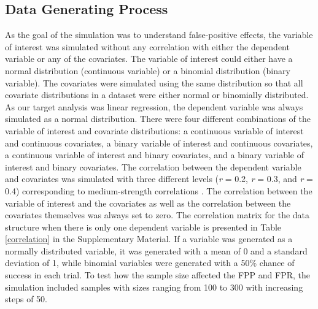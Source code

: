 \subsection{Data Generating Process}
As the goal of the simulation was to understand false-positive effects, the variable of interest was simulated without any correlation with either the dependent variable or any of the covariates. The variable of interest could either have a normal distribution (continuous variable) or a binomial distribution (binary variable). The covariates were simulated using the same distribution so that all covariate distributions in a dataset were either normal or binomially distributed. As our target analysis was linear regression, the dependent variable was always simulated as a normal distribution. There were four different combinations of the variable of interest and covariate distributions: a continuous variable of interest and continuous covariates, a binary variable of interest and continuous covariates, a continuous variable of interest and binary covariates, and a binary variable of interest and binary covariates. The correlation between the dependent variable and covariates was simulated with three different levels (\textit{r} = 0.2, \textit{r} = 0.3, and \textit{r} = 0.4) corresponding to medium-strength correlations \citep{Cohen1989}. The correlation between the variable of interest and the covariates as well as the correlation between the covariates themselves was always set to zero. The correlation matrix for the data structure when there is only one dependent variable is presented in Table \ref{correlation} in the Supplementary Material. If a variable was generated as a normally distributed variable, it was generated with a mean of 0 and a standard deviation of 1, while binomial variables were generated with a 50\% chance of success in each trial. To test how the sample size affected the FPP and FPR, the simulation included samples with sizes ranging from 100 to 300 with increasing steps of 50. 

